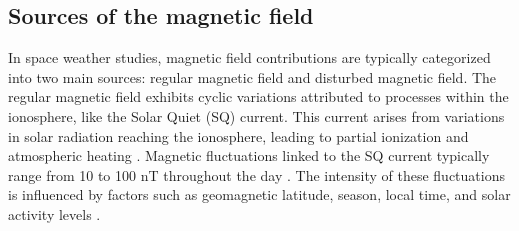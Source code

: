 \documentclass[12pt]{article}
\begin{document}
\subsection{Sources of the magnetic field}
In space weather studies, magnetic field contributions are typically categorized into two main sources: regular magnetic field and disturbed magnetic field. The regular magnetic field exhibits cyclic variations attributed to processes within the ionosphere, like the Solar Quiet (SQ) current. This current arises from variations in solar radiation reaching the ionosphere, leading to partial ionization and atmospheric heating \citep{l3, l_basic_spaceplasmaphysic}. Magnetic fluctuations linked to the SQ current typically range from 10 to 100 nT throughout the day \citep{iaga_guide, baseline_Gjerloev}. The intensity of these fluctuations is influenced by factors such as geomagnetic latitude, season, local time, and solar activity levels \citep{iaga_guide, gombosi_1998, l_handbook_geof_sw_Geom_field}.\\
\end{document}
